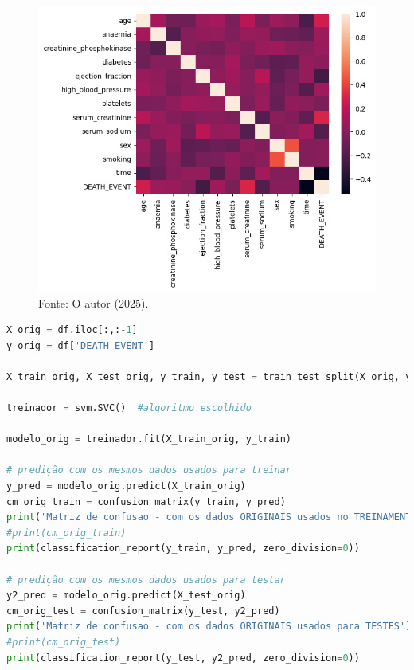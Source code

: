 \begin{figure}[H]
\centering
\caption{Mapa de correlação dados clínicos}
\includegraphics[width=1\linewidth]{apendices/fig/6_IAA006_1.png}
\caption*{Fonte: O autor (2025).}
\end{figure}


\begin{lstlisting}[language=Python, style=input]
X_orig = df.iloc[:,:-1]
y_orig = df['DEATH_EVENT']

X_train_orig, X_test_orig, y_train, y_test = train_test_split(X_orig, y_orig, test_size=0.20, stratify=y_orig,random_state=10)

treinador = svm.SVC()  #algoritmo escolhido

modelo_orig = treinador.fit(X_train_orig, y_train)

# predição com os mesmos dados usados para treinar
y_pred = modelo_orig.predict(X_train_orig)
cm_orig_train = confusion_matrix(y_train, y_pred)
print('Matriz de confusao - com os dados ORIGINAIS usados no TREINAMENTO')
#print(cm_orig_train)
print(classification_report(y_train, y_pred, zero_division=0))

# predição com os mesmos dados usados para testar
y2_pred = modelo_orig.predict(X_test_orig)
cm_orig_test = confusion_matrix(y_test, y2_pred)
print('Matriz de confusao - com os dados ORIGINAIS usados para TESTES')
#print(cm_orig_test)
print(classification_report(y_test, y2_pred, zero_division=0))
\end{lstlisting}


